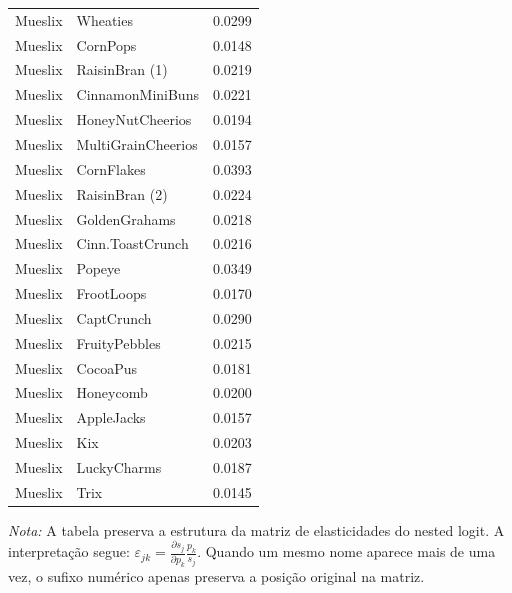 \begin{table}[H]
\begin{tabular}{llr}
Mueslix & Wheaties & 0.0299 \\
Mueslix & CornPops & 0.0148 \\
Mueslix & RaisinBran (1) & 0.0219 \\
Mueslix & CinnamonMiniBuns & 0.0221 \\
Mueslix & HoneyNutCheerios & 0.0194 \\
Mueslix & MultiGrainCheerios & 0.0157 \\
Mueslix & CornFlakes & 0.0393 \\
Mueslix & RaisinBran (2) & 0.0224 \\
Mueslix & GoldenGrahams & 0.0218 \\
Mueslix & Cinn.ToastCrunch & 0.0216 \\
Mueslix & Popeye & 0.0349 \\
Mueslix & FrootLoops & 0.0170 \\
Mueslix & CaptCrunch & 0.0290 \\
Mueslix & FruityPebbles & 0.0215 \\
Mueslix & CocoaPus & 0.0181 \\
Mueslix & Honeycomb & 0.0200 \\
Mueslix & AppleJacks & 0.0157 \\
Mueslix & Kix & 0.0203 \\
Mueslix & LuckyCharms & 0.0187 \\
Mueslix & Trix & 0.0145 \\
\bottomrule
\end{tabular}

\vspace{0.3em}
\footnotesize
\textit{Nota:} A tabela preserva a estrutura da matriz de elasticidades do nested logit. A interpretação segue: $\varepsilon_{jk}=\frac{\partial s_j}{\partial p_k}\frac{p_k}{s_j}$. Quando um mesmo nome aparece mais de uma vez, o sufixo numérico apenas preserva a posição original na matriz.
\end{table}
\endgroup


